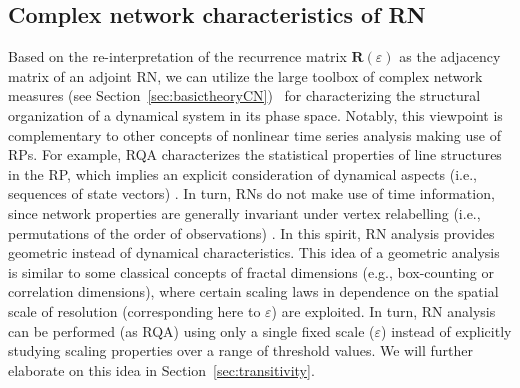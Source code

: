 		\subsection{Complex network characteristics of RN} \label{sec:rn_measures}
		Based on the re-interpretation of the recurrence matrix $\mathbf{R}(\varepsilon)$ as the adjacency matrix of an adjoint RN, we can utilize the large toolbox of complex network measures (see Section~\ref{sec:basictheoryCN})~\cite{Albert2002,Boccaletti2006,Costa2007,Newman2003} for characterizing the structural organization of a dynamical system in its phase space. Notably, this viewpoint is complementary to other concepts of nonlinear time series analysis making use of RPs. For example, RQA characterizes the statistical properties of line structures in the RP, which implies an explicit consideration of dynamical aspects (i.e., sequences of state vectors) \cite{marwan2007}. In turn, RNs do not make use of time information, since network properties are generally invariant under vertex relabelling (i.e., permutations of the order of observations) \cite{Donner2010a}. In this spirit, RN analysis provides geometric instead of dynamical characteristics. This idea of a geometric analysis is similar to some classical concepts of fractal dimensions (e.g., box-counting or correlation dimensions), where certain scaling laws in dependence on the spatial scale of resolution (corresponding here to $\varepsilon$) are exploited. In turn, RN analysis can be performed (as RQA) using only a single fixed scale ($\varepsilon$) instead of explicitly studying scaling properties over a range of threshold values. We will further elaborate on this idea in Section~\ref{sec:transitivity}.

